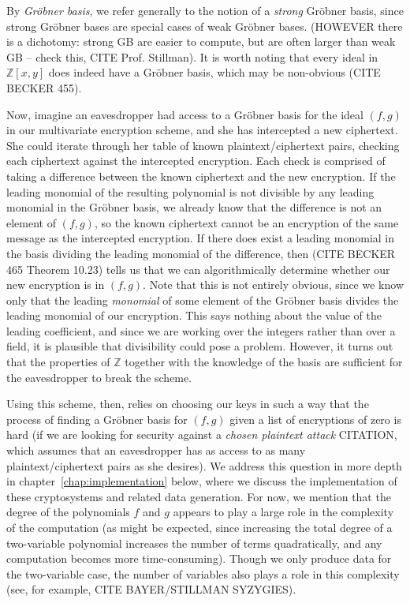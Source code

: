 \documentclass[11pt]{report}
\newcommand{\Z}{\mathbb{Z}}
\newcommand{\Zxy}{\mathbb{Z}[x,y]}
\begin{document}
By \emph{Gr\"obner basis}, we refer generally to the notion of a \emph{strong} Gr\"obner basis, since strong Gr\"obner bases are special cases of weak Gr\"obner bases. (HOWEVER there is a dichotomy: strong GB are easier to compute, but are often larger than weak GB -- check this, CITE Prof. Stillman). It is worth noting that every ideal in $\Zxy$ does indeed have a Gr\"obner basis, which may be non-obvious (CITE BECKER 455).

Now, imagine an eavesdropper had access to a Gr\"obner basis for the ideal $(f,g)$ in our multivariate encryption scheme, and she has intercepted a new ciphertext. She could iterate through her table of known plaintext/ciphertext pairs, checking each ciphertext against the intercepted encryption. Each check is comprised of taking a difference between the known ciphertext and the new encryption. If the leading monomial of the resulting polynomial is not divisible by any leading monomial in the Gr\"obner basis, we already know that the difference is not an element of $(f,g)$, so the known ciphertext cannot be an encryption of the same message as the intercepted encryption. If there does exist a leading monomial in the basis dividing the leading monomial of the difference, then (CITE BECKER 465 Theorem 10.23) tells us that we can algorithmically determine whether our new encryption is in $(f,g)$. Note that this is not entirely obvious, since we know only that the leading \emph{monomial} of some element of the Gr\"obner basis divides the leading monomial of our encryption. This says nothing about the value of the leading coefficient, and since we are working over the integers rather than over a field, it is plausible that divisibility could pose a problem. However, it turns out that the properties of $\Z$ together with the knowledge of the basis are sufficient for the eavesdropper to break the scheme.

Using this scheme, then, relies on choosing our keys in such a way that the process of finding a Gr\"obner basis for $(f,g)$ given a list of encryptions of zero is hard (if we are looking for security against a \emph{chosen plaintext attack} CITATION, which assumes that an eavesdropper has as access to as many plaintext/ciphertext pairs as she desires). We address this question in more depth in chapter~\ref{chap:implementation} below, where we discuss the implementation of these cryptosystems and related data generation. For now, we mention that the degree of the polynomials $f$ and $g$ appears to play a large role in the complexity of the computation (as might be expected, since increasing the total degree of a two-variable polynomial increases the number of terms quadratically, and any computation becomes more time-consuming). Though we only produce data for the two-variable case, the number of variables also plays a role in this complexity (see, for example, CITE BAYER/STILLMAN SYZYGIES).
\end{document}
